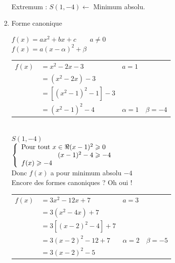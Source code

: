 \begin{enumerate}
Extremum : $S(1, -4) \leftarrow $ Minimum absolu.      
                                        
\item Forme canonique

$f(x) = ax^2 +bx +c \qquad a\neq 0$\\

$f(x) = a (x - \alpha) ^2 + \beta $\\

\begin{tabular}{l@{$\;$}ll}
$f(x) $  & $= x^2 -2x -3$            & $a=1$ \\
            & $= (x^2 -2x) -3$          &           \\
            & $= [(x^2 -1)^2 -1] -3 $ &          \\            
            & $=  (x^2 -1)^2 -4       $ &  $ \alpha = 1  \quad  \beta = -4 $ \\                 
\end{tabular}\\

$S(1,-4) $\\

$\left\lbrace \begin{array}{r@{$\;$}l}
\text{Pour tout  } x \in \Re (x-1)^2 &   \geqslant 0 \\
                          (x-1)^2 -4  &  \geqslant -4 \\     
 \multicolumn{2}{l}{ f(x) \geqslant -4 } \\                                              
\end{array}   \right. $ \\

Donc $f(x)$ a pour minimum absolu  $-4$ \\

\newpage
Encore des formes canoniques ? Oh oui ! 


\begin{tabular}{l@{$\;$}ll}
$f(x) $  & $= 3x^2 -12x +7$            & $a=3$ \\
            & $= 3(x^2 -4x)  +7$          &           \\
            & $= 3[(x -2)^2 -4] +7 $ &          \\            
            & $=  3(x -2)^2 -12 +7 $ &  $ \alpha = 2  \quad  \beta = -5 $ \\      
            & $=  3(x -2)^2 -5       $ &   \\               
\end{tabular}\\


\end{enumerate}
